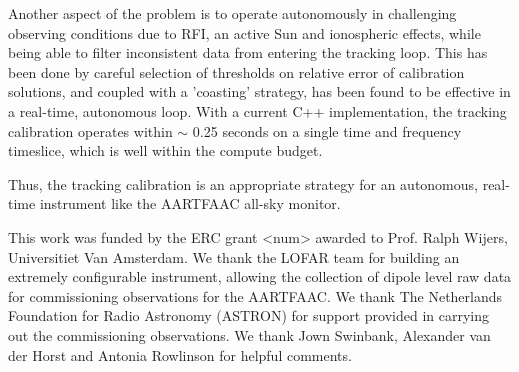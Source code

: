 \documentclass{aa}
\begin{document}
Another  aspect  of  the  problem  is to  operate  autonomously  in  challenging
observing conditions  due to RFI, an  active Sun and  ionospheric effects, while
being able to filter inconsistent data from entering the tracking loop. This has
been done  by careful selection of  thresholds on relative  error of calibration
solutions,  and  coupled  with a  'coasting'  strategy,  has  been found  to  be
effective in  a real-time, autonomous  loop. With a current  C++ implementation,
the tracking  calibration operates within $\sim$  0.25 seconds on  a single time
and frequency timeslice, which is well within the compute budget.

Thus, the  tracking calibration  is an appropriate  strategy for  an autonomous,
real-time instrument like the AARTFAAC all-sky monitor.


\begin {acknowledgements}

This work  was funded by  the ERC grant  <num> awarded to Prof.  Ralph Wijers, Universitiet Van Amsterdam. We
thank the LOFAR team for building an extremely configurable instrument, allowing
the collection of  dipole level raw data for  commissioning observations for the
AARTFAAC. We thank  The Netherlands Foundation for Radio  Astronomy (ASTRON) for
support  provided in carrying  out the  commissioning observations. We thank Jown Swinbank, Alexander van der Horst and Antonia Rowlinson for helpful comments.
\end{acknowledgements}


\end{document}
